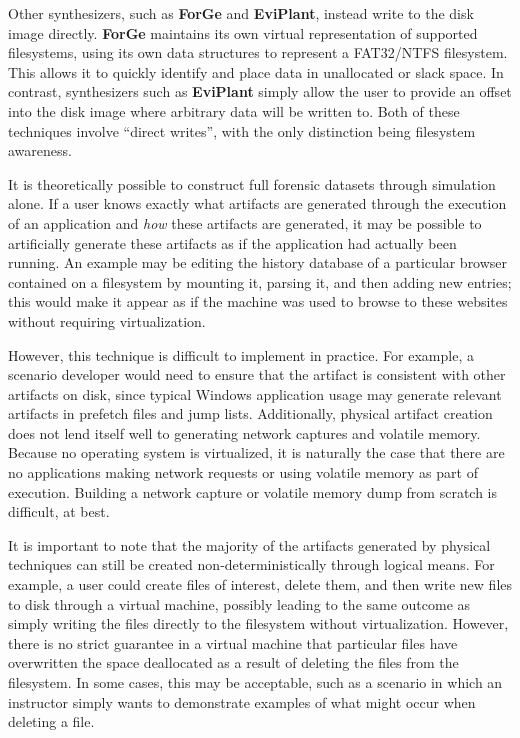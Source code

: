 \documentclass[letterpaper,12pt]{report}
\begin{document}
Other synthesizers, such as \textbf{ForGe} and \textbf{EviPlant},
instead write to the disk image directly. \textbf{ForGe} maintains its
own virtual representation of supported filesystems, using its own data
structures to represent a FAT32/NTFS filesystem. This allows it to
quickly identify and place data in unallocated or slack space. In
contrast, synthesizers such as \textbf{EviPlant} simply allow the user
to provide an offset into the disk image where arbitrary data will be
written to. Both of these techniques involve ``direct writes'', with the
only distinction being filesystem awareness.

It is theoretically possible to construct full forensic datasets through
simulation alone. If a user knows exactly what artifacts are generated
through the execution of an application and \emph{how} these artifacts
are generated, it may be possible to artificially generate these
artifacts as if the application had actually been running. An example
may be editing the history database of a particular browser contained on
a filesystem by mounting it, parsing it, and then adding new entries;
this would make it appear as if the machine was used to browse to these
websites without requiring virtualization.

However, this technique is difficult to implement in practice. For
example, a scenario developer would need to ensure that the artifact is
consistent with other artifacts on disk, since typical Windows
application usage may generate relevant artifacts in prefetch files and
jump lists. Additionally, physical artifact creation does not lend
itself well to generating network captures and volatile memory. Because
no operating system is virtualized, it is naturally the case that there
are no applications making network requests or using volatile memory as
part of execution. Building a network capture or volatile memory dump
from scratch is difficult, at best.

It is important to note that the majority of the artifacts generated by
physical techniques can still be created non-deterministically through
logical means. For example, a user could create files of interest,
delete them, and then write new files to disk through a virtual machine,
possibly leading to the same outcome as simply writing the files
directly to the filesystem without virtualization. However, there is no
strict guarantee in a virtual machine that particular files have
overwritten the space deallocated as a result of deleting the files from
the filesystem. In some cases, this may be acceptable, such as a
scenario in which an instructor simply wants to demonstrate examples of
what might occur when deleting a file.
\end{document}
